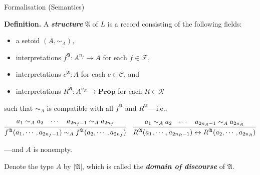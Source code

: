 \documentclass[serif,table,10pt]{beamer}
\newcommand{\0}{\texttt{0}}
\newcommand{\1}{\texttt{1}}
\newcommand{\inlinedef}[1]{\emph{\textbf{#1}}}
\newcommand{\Prop}{\mathbf{Prop}}
\begin{document}
\begin{frame}{Formalisation (Semantics)}

    \textbf{Definition.}
    A \inlinedef{structure} $\mathfrak{A}$ of $L$ is a record consisting of the following fields:
    \begin{itemize}
        \item a setoid $( A , \sim_A )$,
        \item interpretations $ f^\mathfrak{A} : A^{n_f} \to A $ for each $f \in \mathcal{F}$,
        \item interpretations $ c^\mathfrak{A} : A $ for each $c \in \mathcal{C}$, and
        \item interpretations $ R^\mathfrak{A} : A^{n_R} \to \Prop $ for each $R \in \mathcal{R}$
    \end{itemize}
    such that $\sim_A$ is compatible with all $f^\mathfrak{A}$ and $R^\mathfrak{A}$\textbf{---}i.e.,
    \begin{center} \small
        $ \infer{f^\mathfrak{A} (a_1 , \cdots , a_{2 n_f - 1}) \sim_A f^\mathfrak{A} (a_2 , \cdots , a_{2 n_f} )}{a_1 \sim_A a_2 & \cdots & a_{2 n_f - 1} \sim_A a_{2 n_f}} \quad \infer{R^\mathfrak{A} (a_1 , \cdots , a_{2 n_R - 1}) \leftrightarrow R^\mathfrak{A} (a_2 , \cdots , a_{2 n_R} )}{a_1 \sim_A a_2 & \cdots & a_{2 n_R - 1} \sim_A a_{2 n_R}} $
    \end{center}
    \textbf{---}and $A$ is nonempty.

    Denote the type $A$ by $| \mathfrak{A} |$, which is called the \inlinedef{domain of discourse} of $\mathfrak{A}$.

\end{frame}
\end{document}
